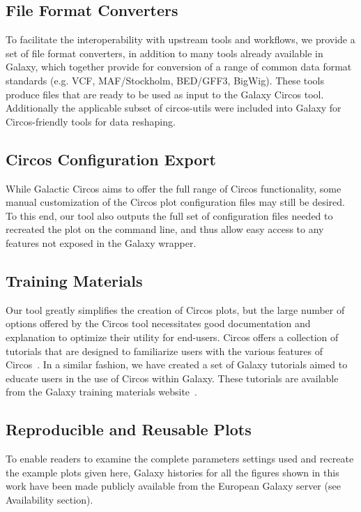 \subsection*{File Format Converters}
To facilitate the interoperability with upstream tools and workflows, we provide a set of file format converters, in addition to many tools already available in Galaxy, which together provide for conversion of a range of common data format standards (e.g. VCF, MAF/Stockholm, BED/GFF3, BigWig). These tools produce files that are ready to be used as input to the Galaxy Circos tool. Additionally the applicable subset of circos-utils were included into Galaxy for Circos-friendly tools for data reshaping.

\subsection*{Circos Configuration Export}
While Galactic Circos aims to offer the full range of Circos functionality, some manual customization of the Circos plot configuration files may still be desired. To this end, our tool also outputs the full set of configuration files needed to recreated the plot on the command line, and thus allow easy access to any features not exposed in the Galaxy wrapper.

\subsection*{Training Materials}
Our tool greatly simplifies the creation of Circos plots, but the large number of options offered by the Circos tool necessitates good documentation and explanation to optimize their utility for end-users. Circos offers a collection of tutorials that are designed to familiarize users with the various features of Circos~\cite{circostutorials}. In a similar fashion, we have created a set of Galaxy tutorials aimed to educate users in the use of Circos within Galaxy. These tutorials are available from the Galaxy training materials website~\cite{Batut2018}.

\subsection*{Reproducible and Reusable Plots}
To enable readers to examine the complete parameters settings used and recreate the example plots given here, Galaxy histories for all the figures shown in this work have been made publicly available from the European Galaxy server (see Availability section).

